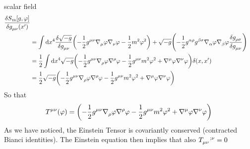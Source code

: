 scalar field
\begin{equation}
\begin{split}
\frac{\delta
S\textsubscript{m}[g,\varphi]}{\delta \tensor{g}{_\mu_\nu}\left(x'\right)}\\
&=\int \dif x^4 \frac{\delta\sqrt{-g}}{\delta
\tensor{g}{_\mu_\nu}}\left(-\frac{1}{2}\tensor{g}{^\mu^\nu}
\tensor{\nabla}{_\mu}\varphi\tensor{\nabla}{_\nu}\varphi-\frac{1}{2}m^2\varphi^2\right)
+ \sqrt{-g}\left(-\frac{1}{2}\tensor{g}{^\alpha^\rho}\tensor{g}{^\beta^\sigma}
\tensor{\nabla}{_\alpha}\varphi\tensor{\nabla}{_\beta}\varphi\frac{\delta
\tensor{g}{_\rho_\sigma}}{\delta \tensor{g}{_\mu_\nu}}\right)\\
&=\frac{1}{2}\int \dif x^4
\sqrt{-g}\left(-\frac{1}{2}\tensor{g}{^\mu^\nu}\tensor{\nabla}{_\rho}\varphi\tensor{\nabla}{^\rho}\varphi-\frac{1}{2}\tensor{g}{^\mu^\nu}m^2\varphi^2
+\tensor{\nabla}{^\mu}\varphi\tensor{\nabla}{^\nu}\varphi\right)\delta(x,x')\\
&=\frac{1}{2}\sqrt{-g}\left(-\frac{1}{2}\tensor{g}{^\mu^\nu}\tensor{\nabla}{_\rho}\varphi\tensor{\nabla}{^\rho}\varphi-\frac{1}{2}\tensor{g}{^\mu^\nu}m^2\varphi^2
+\tensor{\nabla}{^\mu}\varphi\tensor{\nabla}{^\nu}\varphi\right)
\end{split}
\end{equation}
So that 
\begin{equation}
\tensor{T}{^\mu^\nu}(\varphi)=
\left(-\frac{1}{2}\tensor{g}{^\mu^\nu}\tensor{\nabla}{_\rho}\varphi\tensor{\nabla}{^\rho}\varphi-\frac{1}{2}\tensor{g}{^\mu^\nu}m^2\varphi^2
+\tensor{\nabla}{^\mu}\varphi\tensor{\nabla}{^\nu}\varphi\right)
\end{equation}
As we have noticed, the Einstein Tensor is covariantly conserved (contracted
Bianci identities). The Einstein equation then implies that also
$\tensor{T}{_\mu_\nu^{;\nu}}=0$
